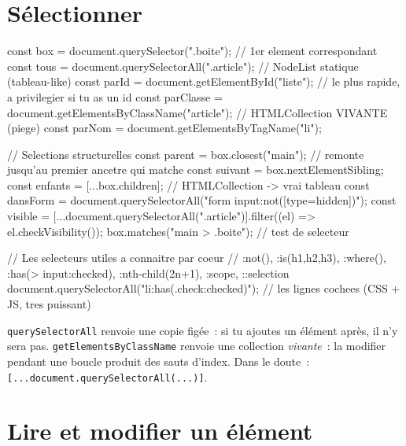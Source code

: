 \documentclass[12pt,a4paper,twoside,openright]{book}
\begin{document}
\section{S\'electionner}

\begin{codejs}
const box = document.querySelector(".boite");       // 1er element correspondant
const tous = document.querySelectorAll(".article");  // NodeList statique (tableau-like)
const parId = document.getElementById("liste");      // le plus rapide, a privilegier si tu as un id
const parClasse = document.getElementsByClassName("article");   // HTMLCollection VIVANTE (piege)
const parNom = document.getElementsByTagName("li");

// Selections structurelles
const parent = box.closest("main");          // remonte jusqu'au premier ancetre qui matche
const suivant = box.nextElementSibling;
const enfants = [...box.children];           // HTMLCollection -> vrai tableau
const dansForm = document.querySelectorAll("form input:not([type=hidden])");
const visible = [...document.querySelectorAll(".article")].filter((el) => el.checkVisibility());
box.matches("main > .boite");                 // test de selecteur

// Les selecteurs utiles a connaitre par coeur
// :not(), :is(h1,h2,h3), :where(), :has(> input:checked), :nth-child(2n+1), :scope, ::selection
document.querySelectorAll("li:has(.check:checked)");     // les lignes cochees (CSS + JS, tres puissant)
\end{codejs}

\begin{note}
\texttt{querySelectorAll} renvoie une copie fig\'ee~: si tu ajoutes un \'el\'ement apr\`es, il n'y sera
pas. \texttt{getElementsByClassName} renvoie une collection \emph{vivante}~: la modifier pendant
une boucle produit des sauts d'index. Dans le doute~: \verb|[...document.querySelectorAll(...)]|.
\end{note}

\section{Lire et modifier un \'el\'ement}
\end{document}
